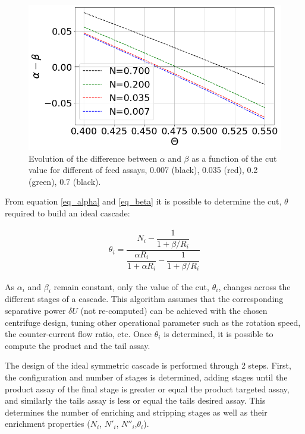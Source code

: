 \begin{figure}[h!] %
    \centering
    \includegraphics[scale=0.5]{alpha_minus_beta}
    \caption{Evolution of the difference between $\alpha$ and $\beta$ as a
    function of the cut value for different of feed assays, 0.007 (black),
    0.035 (red), 0.2 (green), 0.7 (black). }
    \label{fig_a_m_b}
\end{figure}

From equation \eqref{eq_alpha} and \eqref{eq_beta} it is possible to determine
the cut, $\theta$ required to build an ideal cascade:

\begin{eqnarray}
    \theta_{i} = \dfrac{N_{i} - \dfrac{1}{1 + \beta/R_{i}}}{ \dfrac{\alpha R_{i}}{1 + \alpha R_{i}} -
           \dfrac{1}{1 + \beta/R_{i}}}
           \label{eq_theta}
\end{eqnarray}


As $\alpha_{i}$ and $\beta_{i}$ remain constant, only the value of the cut,
$\theta_{i}$, changes across the different stages of a cascade.  This algorithm
assumes that the corresponding separative power $\delta U$ (not re-computed) can
be achieved with the chosen centrifuge design, tuning other operational
parameter such as the rotation speed, the counter-current flow ratio, etc.  Once
$\theta_{i}$ is determined, it is possible to compute the product and the tail
assay.




The design of the ideal symmetric cascade is performed through 2 steps. First,
the configuration and number of stages is determined, adding stages until the
product assay of the final stage is greater or equal the product targeted assay,
and similarly the tails assay is less or equal the tails desired assay.  This
determines the number of enriching and stripping stages as well as their
enrichment properties ($N_{i}$, $N'_{i}$, $N''_{i}$,$\theta_{i}$).


